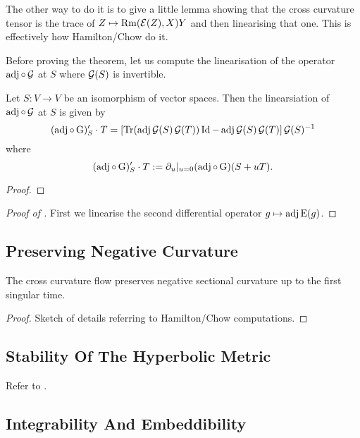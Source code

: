 \documentclass[a4paper, 12pt]{amsart}
\begin{document}
{\color{red} The other way to do it is to give a little lemma showing that the cross curvature tensor is the trace of \(Z \mapsto \operatorname{Rm}(\operatorname{\mathcal{E}}(Z), X) Y\) and then linearising that one. This is effectively how Hamilton/Chow do it.}

Before proving the theorem, let us compute the linearisation of the operator \(\operatorname{adj} \circ \operatorname{\mathcal{G}}\) at \(S\) where \(\operatorname{\mathcal{G}}(S)\) is invertible.

\begin{lemma}
Let \(S : V \to V\) be an isomorphism of vector spaces. Then the linearsiation of \(\operatorname{adj} \circ \operatorname{\mathcal{G}}\) at \(S\) is given by
\[
(\operatorname{adj} \circ \operatorname{G})'_S \cdot T  = \left[\operatorname{Tr}(\operatorname{adj}\operatorname{\mathcal{G}}(S) \operatorname{\mathcal{G}}(T))\operatorname{Id} - \operatorname{adj}\operatorname{\mathcal{G}}(S) \operatorname{\mathcal{G}}(T)\right] \operatorname{\mathcal{G}}(S)^{-1}
\]
where
\[
(\operatorname{adj} \circ \operatorname{G})'_S \cdot T := \partial_u|_{u=0} (\operatorname{adj} \circ \operatorname{G}) (S + uT).
\]
\end{lemma}

\begin{proof}

\end{proof}

\begin{proof}[Proof of ]
First we linearise the second differential operator \(g \mapsto \operatorname{adj}\operatorname{E}(g)\). 
\end{proof}

\subsection{Preserving Negative Curvature}
\label{subsec:xcf_preserving}

\begin{lemma}
The cross curvature flow preserves negative sectional curvature up to the first singular time.
\end{lemma}

\begin{proof}
{\color{red} Sketch of details referring to Hamilton/Chow computations.}
\end{proof}

\subsection{Stability Of The Hyperbolic Metric}
\label{subsec:xcf_stability}

{\color{red} Refer to \cite{MR2448593}.}

\subsection{Integrability And Embeddibility}
\label{subsec:xcf_gcf}
\end{document}
